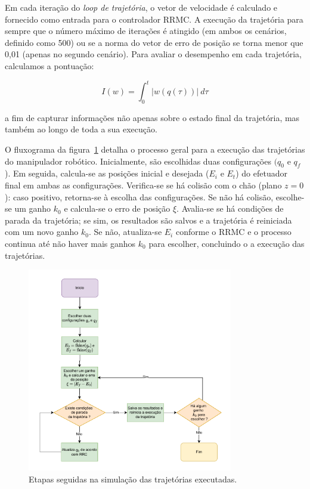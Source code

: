 Em cada iteração do \emph{loop de trajetória}, o vetor de velocidade é calculado e 
fornecido como entrada para o controlador RRMC. A execução da trajetória para sempre 
que o número máximo de iterações é atingido (em ambos os cenários, definido como 500) ou 
se a norma do vetor de erro de posição se torna menor que 0,01 (apenas no segundo cenário). 
Para avaliar o desempenho em cada trajetória, calculamos a pontuação:

\begin{equation}
	I(w) = \int_0^t {|w(q(\tau))| \ d\tau}
\end{equation}
	
a fim de capturar informações não apenas sobre o estado final da trajetória, mas também ao 
longo de toda a sua execução.

O fluxograma da figura~\ref*{fig:exp-flow} detalha o processo geral para a execução das 
trajetórias do manipulador robótico. Inicialmente, são escolhidas duas configurações 
\((q_0\) e \(q_f\)). Em seguida, calcula-se as posições inicial e desejada (\(E_i\) e 
\(E_t\)) do efetuador final em ambas as configurações. Verifica-se se há colisão com 
o chão (plano $z=0$): caso positivo, retorna-se à escolha das configurações. Se não há 
colisão, escolhe-se um ganho \(k_0\) e calcula-se o erro de posição \(\xi\). Avalia-se 
se há condições de parada da trajetória; se sim, os resultados são salvos e a trajetória 
é reiniciada com um novo ganho \(k_0\). Se não, atualiza-se \(E_i\) conforme o RRMC
e o processo continua até não haver mais ganhos \(k_0\) para escolher, concluindo o 
a execução das trajetórias.

\begin{figure}
	\centering
	\includegraphics[width=0.8\textwidth]{./Images/exp-flow.pdf}
	\caption{Etapas seguidas na simulação das trajetórias executadas.}\label{fig:exp-flow}
\end{figure}

